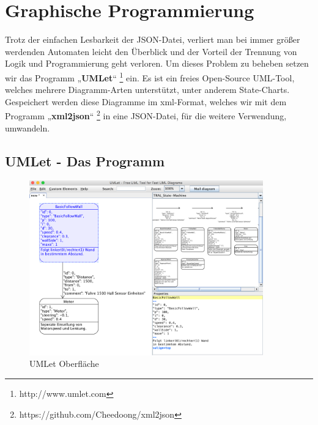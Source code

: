 \section{Graphische Programmierung}
\label{sec:graphischeprogrammierung}

Trotz der einfachen Lesbarkeit der JSON-Datei, verliert man bei immer größer
werdenden Automaten leicht den Überblick und der Vorteil der Trennung von Logik
und Programmierung geht verloren. Um dieses Problem zu beheben setzen wir das
Programm „\textbf{UMLet}“ \footnote[1]{http://www.umlet.com} ein. Es ist ein freies Open-Source UML-Tool, welches mehrere
Diagramm-Arten unterstützt, unter anderem State-Charts. Gespeichert werden
diese Diagramme im xml-Format, welches wir mit dem Programm „\textbf{xml2json}“ \footnote[2]{https://github.com/Cheedoong/xml2json}
in eine JSON-Datei, für die weitere Verwendung, umwandeln.
\subsection{UMLet - Das Programm}
\begin{figure}[ht]
\centering 
\includegraphics[width=0.90\textwidth]{images/umlet-bsp.png} 
\caption{UMLet Oberfläche}
\label{fig:umlet}
\end{figure}

